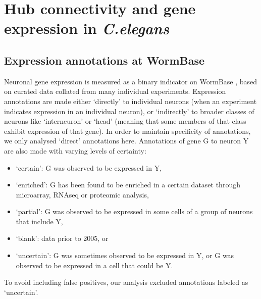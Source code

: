 \chapter{Hub connectivity and gene expression in \textit{C.elegans}}
\label{appendixA}


\section{Expression annotations at WormBase}
\label{app:AppendixCh2_1}

Neuronal gene expression is measured as a binary indicator on WormBase \citep{Harris2010}, based on curated data collated
from many individual experiments. Expression annotations are made either ‘directly’ to individual neurons (when
an experiment indicates expression in an individual neuron), or ‘indirectly’ to broader classes of neurons like
‘interneuron’ or ‘head’ (meaning that some members of that class exhibit expression of that gene). In order to
maintain specificity of annotations, we only analysed ‘direct' annotations here.
Annotations of gene G to neuron Y are also made with varying levels of certainty:
\begin{itemize}
\item ‘certain’: G was observed to be expressed in Y,
\item ‘enriched’: G has been found to be enriched in a certain dataset through microarray, RNAseq or
proteomic analysis,
\item ‘partial’: G was observed to be expressed in some cells of a group of neurons that include Y,
\item ‘blank’: data prior to 2005, or
\item ‘uncertain’: G was sometimes observed to be expressed in Y, or G was observed to be expressed in a cell
that could be Y.
\end{itemize}

To avoid including false positives, our analysis excluded annotations labeled as ‘uncertain’.


